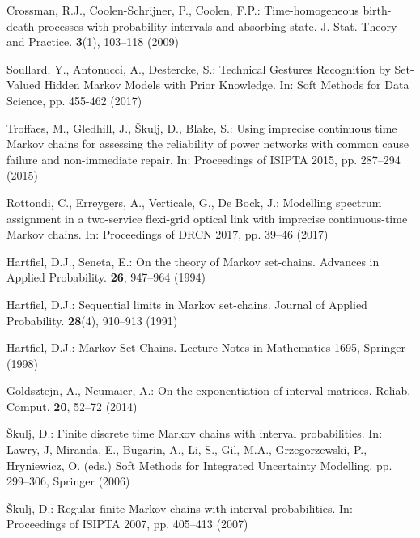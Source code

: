 \begin{thebibliography}{99.}
Crossman, R.J., Coolen-Schrijner, P., Coolen, F.P.: {Time-homogeneous birth-death processes with probability intervals and absorbing state}. J. Stat. Theory and Practice. \textbf{3}(1), 103--118 (2009)


Soullard, Y., Antonucci, A., Destercke, S.: {Technical Gestures Recognition by Set-Valued Hidden Markov Models with Prior Knowledge}. In: Soft Methods for Data Science, pp. 455-462 (2017)

Troffaes, M., Gledhill, J., {\v{S}}kulj, D., Blake, S.: {Using imprecise continuous time Markov chains for assessing the reliability of power networks with common cause failure and non-immediate repair}. In: Proceedings of ISIPTA 2015, pp. 287--294 (2015)

Rottondi, C., Erreygers, A., Verticale, G., De Bock, J.: {Modelling spectrum assignment in a two-service flexi-grid optical link with imprecise continuous-time Markov chains}. In: Proceedings of DRCN 2017, pp. 39--46 (2017)



Hartfiel, D.J., Seneta, E.: {On the theory of Markov set-chains}.
Advances in Applied Probability. \textbf{26}, 947--964 (1994)

Hartfiel, D.J.: {Sequential limits in Markov set-chains}.
Journal of Applied Probability. \textbf{28}(4), 910--913 (1991)

Hartfiel, D.J.: {Markov Set-Chains}. Lecture Notes in Mathematics 1695, Springer (1998)

Goldsztejn, A., Neumaier,  A.: {On the exponentiation of interval matrices}. Reliab. Comput. \textbf{20}, 52--72 (2014)

{\v{S}}kulj,  D.: {Finite  discrete  time  Markov  chains  with  interval  probabilities}. In: Lawry, J, Miranda, E., Bugarin, A., Li, S., Gil, M.A.,  Grzegorzewski,  P., Hryniewicz, O. (eds.)
Soft Methods for Integrated Uncertainty Modelling, pp. 299--306, Springer (2006)

{\v{S}}kulj, D.: {Regular finite Markov chains with interval probabilities}. In: Proceedings of ISIPTA 2007, pp. 405--413 (2007)



\end{thebibliography}
